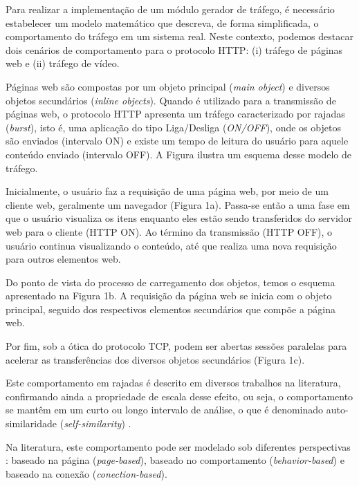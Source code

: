 Para realizar a implementação de um módulo gerador de tráfego, é necessário estabelecer um modelo matemático que descreva, de forma simplificada, o comportamento do tráfego em um sistema real. Neste contexto, podemos destacar dois cenários de comportamento para o protocolo HTTP: (i) tráfego de páginas web e (ii) tráfego de vídeo.

Páginas web são compostas por um objeto principal (\textit{main object}) e diversos objetos secundários (\textit{inline objects}). Quando é utilizado para a transmissão de páginas web, o protocolo HTTP apresenta um tráfego caracterizado por rajadas (\textit{burst}), isto é, uma aplicação do tipo Liga/Desliga (\textit{ON/OFF}), onde os objetos são enviados (intervalo ON) e existe um tempo de leitura do usuário para aquele conteúdo enviado (intervalo OFF). A Figura  ilustra um esquema desse modelo de tráfego.


Inicialmente, o usuário faz a requisição de uma página web, por meio de um cliente web, geralmente um navegador (Figura 1a). Passa-se então a uma fase em que o usuário visualiza os itens enquanto eles estão sendo transferidos do servidor web para o cliente (HTTP ON). Ao término da transmissão (HTTP OFF), o usuário continua visualizando o conteúdo, até que realiza uma nova requisição para outros elementos web.

Do ponto de vista do processo de carregamento dos objetos, temos o esquema apresentado na Figura 1b. A requisição da página web se inicia com o objeto principal, seguido dos respectivos elementos secundários que compõe a página web.

Por fim, sob a ótica do protocolo TCP, podem ser abertas sessões paralelas para acelerar as transferências dos diversos objetos secundários (Figura 1c).

Este comportamento em rajadas é descrito em diversos trabalhos na literatura, confirmando ainda a propriedade de escala desse efeito, ou seja, o comportamento se mantêm em um curto ou longo intervalo de análise, o que é denominado auto-similaridade (\textit{self-similarity}) \cite{Crovella1997}.

Na literatura, este comportamento pode ser modelado sob diferentes perspectivas \cite{Cheng2013}: baseado na página (\textit{page-based}), baseado no comportamento (\textit{behavior-based}) e baseado na conexão (\textit{conection-based}).

